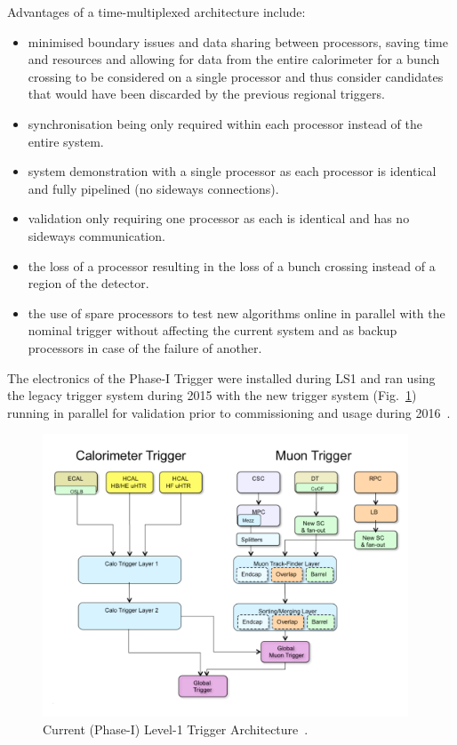 Advantages of a time-multiplexed architecture include:
\begin{itemize}
\item minimised boundary issues and data sharing between processors, saving time and resources and allowing for data from the entire calorimeter for a bunch crossing to be considered on a single processor and thus consider candidates that would have been discarded by the previous regional triggers.
\item synchronisation being only required within each processor instead of the entire system.
\item system demonstration with a single processor as each processor is identical and fully pipelined (no sideways connections).
\item validation only requiring one processor as each is identical and has no sideways communication.
\item the loss of a processor resulting in the loss of a bunch crossing instead of a region of the detector.
\item the use of spare processors to test new algorithms online in parallel with the nominal trigger without affecting the current system and as backup processors in case of the failure of another.
\end{itemize} 

The electronics of the Phase-I Trigger were installed during LS1 and ran using the legacy trigger system during 2015 with the new trigger system (Fig.~\ref{fig:trigger}) running in parallel for validation prior to commissioning and usage during 2016~\cite{Zabi:2017lya}.

\begin{figure}[htbp]
\begin{center}
\includegraphics[width=0.97\textwidth]{figs/cms/TrigUpgradeBlockDiagram.pdf}
\caption{Current (Phase-I) Level-1 Trigger Architecture~\cite{Tapper:2013yva}.}
\label{fig:trigger}
\end{center}
\end{figure}

